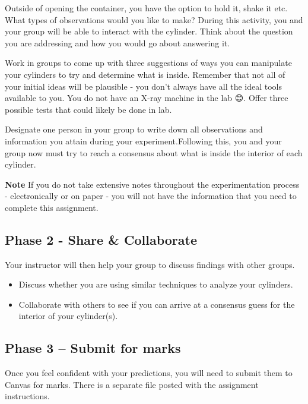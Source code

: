 \documentclass[
]{book}
\providecommand{\tightlist}{%
  \setlength{\itemsep}{0pt}\setlength{\parskip}{0pt}}
\begin{document}
Outside of opening the container, you have the option to hold it, shake it etc. What types of observations would you like to make? During this activity, you and your group will be able to interact with the cylinder. Think about the question you are addressing and how you would go about answering it.

Work in groups to come up with three suggestions of ways you can manipulate your cylinders to try and determine what is inside. Remember that not all of your initial ideas will be plausible - you don't always have all the ideal tools available to you. You do not have an X-ray machine in the lab 😊. Offer three possible tests that could likely be done in lab.

Designate one person in your group to write down all observations and information you attain during your experiment.Following this, you and your group now must try to reach a consensus about what is inside the interior of each cylinder.

\textbf{Note} If you do not take extensive notes throughout the experimentation process - electronically or on paper - you will not have the information that you need to complete this assignment.

\hypertarget{phase-2---share-collaborate}{%
\subsection*{Phase 2 - Share \& Collaborate}\label{phase-2---share-collaborate}}

Your instructor will then help your group to discuss findings with other groups.

\begin{itemize}
\tightlist
\item
  Discuss whether you are using similar techniques to analyze your cylinders.
\item
  Collaborate with others to see if you can arrive at a consensus guess for the interior of your cylinder(s).
\end{itemize}

\hypertarget{phase-3-submit-for-marks}{%
\subsection*{Phase 3 -- Submit for marks}\label{phase-3-submit-for-marks}}

Once you feel confident with your predictions, you will need to submit them to Canvas for marks. There is a separate file posted with the assignment instructions.
\end{document}
